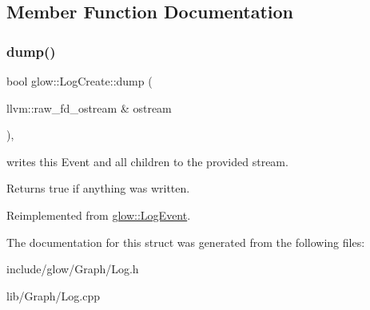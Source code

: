 \subsection{Member Function Documentation}
\mbox{\label{structglow_1_1_log_create_a42bb56ee4419b7a56af5a8e3f55c1a1f}} 
\subsubsection{\texorpdfstring{dump()}{dump()}}
{\footnotesize\ttfamily bool glow\+::\+Log\+Create\+::dump (\begin{DoxyParamCaption}\item[{llvm\+::raw\+\_\+fd\+\_\+ostream \&}]{ostream }\end{DoxyParamCaption})\hspace{0.3cm}{\ttfamily [override]}, {\ttfamily [virtual]}}

writes this Event and all children to the provided stream. \begin{DoxyReturn}{Returns}
true if anything was written. 
\end{DoxyReturn}


Reimplemented from \hyperlink{structglow_1_1_log_event_a1c25aa690ea65f6b184ba3133fd6c564}{glow\+::\+Log\+Event}.



The documentation for this struct was generated from the following files\+:\begin{DoxyCompactItemize}
\item 
include/glow/\+Graph/Log.\+h\item 
lib/\+Graph/Log.\+cpp\end{DoxyCompactItemize}
